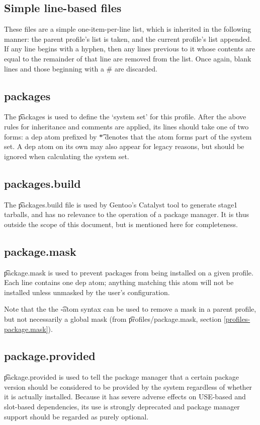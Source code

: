 \subsection{Simple line-based files}
\label{line-stacking}
These files are a simple one-item-per-line list, which is inherited in the following manner: the
parent profile's list is taken, and the current profile's list appended. If any line begins with a
hyphen, then any lines previous to it whose contents are equal to the remainder of that line are
removed from the list. Once again, blank lines and those beginning with a \# are discarded.

\subsection{packages}
The \t{packages} is used to define the `system set' for this profile. After the above rules for
inheritance and comments are applied, its lines should take one of two forms: a dep atom prefixed by
\t{*} denotes that the atom forms part of the system set. A dep atom on its own may also appear for
legacy reasons, but should be ignored when calculating the system set.

\subsection{packages.build}
The \t{packages.build} file is used by Gentoo's Catalyst tool to generate stage1 tarballs, and has
no relevance to the operation of a package manager. It is thus outside the scope of this document,
but is mentioned here for completeness.

\subsection{package.mask}
\t{package.mask} is used to prevent packages from being installed on a given profile. Each line
contains one dep atom; anything matching this atom will not be installed unless unmasked by the
user's configuration.

Note that the the \t{-atom} syntax can be used to remove a mask in a parent profile, but not
necessarily a global mask (from \t{profiles/package.mask}, section \ref{profiles-package.mask}).

\subsection{package.provided}
\t{package.provided} is used to tell the package manager that a certain package version should be
considered to be provided by the system regardless of whether it is actually installed. Because it
has severe adverse effects on USE-based and slot-based dependencies, its use is strongly deprecated
and package manager support should be regarded as purely optional.

